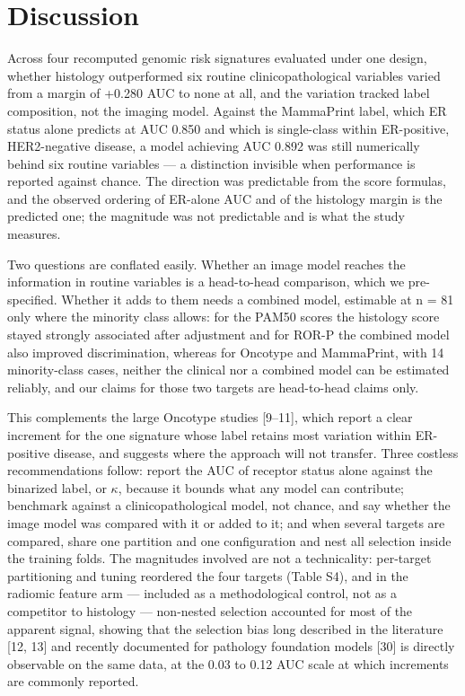 \documentclass[11pt,a4paper]{article}
\begin{document}
\section{Discussion}
Across four recomputed genomic risk signatures evaluated under one design, whether histology outperformed six routine clinicopathological variables varied from a margin of +0.280 AUC to none at all, and the variation tracked label composition, not the imaging model. Against the MammaPrint label, which ER status alone predicts at AUC 0.850 and which is single-class within ER-positive, HER2-negative disease, a model achieving AUC 0.892 was still numerically behind six routine variables --- a distinction invisible when performance is reported against chance. The direction was predictable from the score formulas, and the observed ordering of ER-alone AUC and of the histology margin is the predicted one; the magnitude was not predictable and is what the study measures.

Two questions are conflated easily. Whether an image model reaches the information in routine variables is a head-to-head comparison, which we pre-specified. Whether it adds to them needs a combined model, estimable at n = 81 only where the minority class allows: for the PAM50 scores the histology score stayed strongly associated after adjustment and for ROR-P the combined model also improved discrimination, whereas for Oncotype and MammaPrint, with 14 minority-class cases, neither the clinical nor a combined model can be estimated reliably, and our claims for those two targets are head-to-head claims only.

This complements the large Oncotype studies [9--11], which report a clear increment for the one signature whose label retains most variation within ER-positive disease, and suggests where the approach will not transfer. Three costless recommendations follow: report the AUC of receptor status alone against the binarized label, or $\kappa$, because it bounds what any model can contribute; benchmark against a clinicopathological model, not chance, and say whether the image model was compared with it or added to it; and when several targets are compared, share one partition and one configuration and nest all selection inside the training folds. The magnitudes involved are not a technicality: per-target partitioning and tuning reordered the four targets (Table S4), and in the radiomic feature arm --- included as a methodological control, not as a competitor to histology --- non-nested selection accounted for most of the apparent signal, showing that the selection bias long described in the literature [12, 13] and recently documented for pathology foundation models [30] is directly observable on the same data, at the 0.03 to 0.12 AUC scale at which increments are commonly reported.
\end{document}
